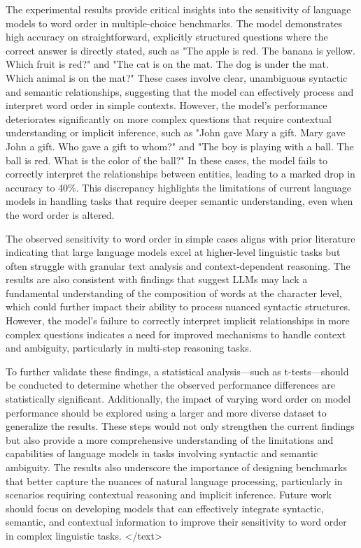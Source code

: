 \documentclass{article}
\begin{document}
The experimental results provide critical insights into the sensitivity of language models to word order in multiple-choice benchmarks. The model demonstrates high accuracy on straightforward, explicitly structured questions where the correct answer is directly stated, such as "The apple is red. The banana is yellow. Which fruit is red?" and "The cat is on the mat. The dog is under the mat. Which animal is on the mat?" These cases involve clear, unambiguous syntactic and semantic relationships, suggesting that the model can effectively process and interpret word order in simple contexts. However, the model's performance deteriorates significantly on more complex questions that require contextual understanding or implicit inference, such as "John gave Mary a gift. Mary gave John a gift. Who gave a gift to whom?" and "The boy is playing with a ball. The ball is red. What is the color of the ball?" In these cases, the model fails to correctly interpret the relationships between entities, leading to a marked drop in accuracy to 40\%. This discrepancy highlights the limitations of current language models in handling tasks that require deeper semantic understanding, even when the word order is altered.

The observed sensitivity to word order in simple cases aligns with prior literature indicating that large language models excel at higher-level linguistic tasks but often struggle with granular text analysis and context-dependent reasoning. The results are also consistent with findings that suggest LLMs may lack a fundamental understanding of the composition of words at the character level, which could further impact their ability to process nuanced syntactic structures. However, the model's failure to correctly interpret implicit relationships in more complex questions indicates a need for improved mechanisms to handle context and ambiguity, particularly in multi-step reasoning tasks.

To further validate these findings, a statistical analysis—such as t-tests—should be conducted to determine whether the observed performance differences are statistically significant. Additionally, the impact of varying word order on model performance should be explored using a larger and more diverse dataset to generalize the results. These steps would not only strengthen the current findings but also provide a more comprehensive understanding of the limitations and capabilities of language models in tasks involving syntactic and semantic ambiguity. The results also underscore the importance of designing benchmarks that better capture the nuances of natural language processing, particularly in scenarios requiring contextual reasoning and implicit inference. Future work should focus on developing models that can effectively integrate syntactic, semantic, and contextual information to improve their sensitivity to word order in complex linguistic tasks.
</text>
\end{document}
